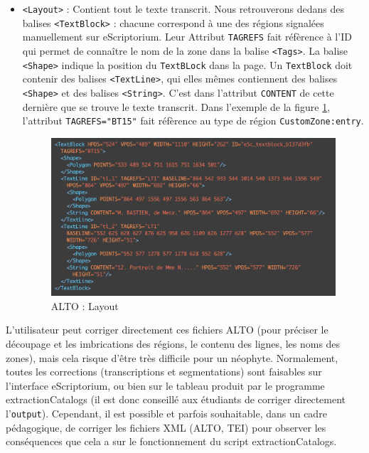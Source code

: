 \documentclass[a4paper,12pt,twoside]{book}
\begin{document}
\begin{itemize}
	\item \texttt{<Layout>} : Contient tout le texte transcrit. Nous retrouverons dedans des balises \texttt{<TextBlock>} : chacune correspond à une des régions signalées manuellement sur eScriptorium. Leur Attribut \texttt{TAGREFS} fait réfèrence à l'ID qui permet de connaître le nom de la zone dans la balise \texttt{<Tags>}. La balise \texttt{<Shape>} indique la position du \texttt{TextBLock} dans la page. Un \texttt{TextBlock} doit contenir des balises \texttt{<TextLine>}, qui elles mêmes contiennent des balises \texttt{<Shape>} et des balises \texttt{<String>}. C'est dans l'attribut \texttt{CONTENT} de cette dernière que se trouve le texte transcrit. Dans l'exemple de la figure \ref{alto4}, l'attribut \texttt{TAGREFS="BT15"} fait réfèrence au type de région \texttt{CustomZone:entry}.
	\begin{figure}[ht]
		\centering
		\includegraphics[scale=0.5]{textblock_alto.png}		
		\caption{ALTO : Layout}
		\label{alto4}
	\end{figure} 	
\end{itemize}

L'utilisateur peut corriger directement ces fichiers ALTO (pour préciser le découpage et les imbrications des régions, le contenu des lignes, les noms des zones), mais cela risque d'être très difficile pour un néophyte. Normalement, toutes les corrections (transcriptions et segmentations) sont faisables sur l'interface eScriptorium, ou bien sur le tableau produit par le programme extractionCatalogs (il est donc conseillé aux étudiants de corriger directement l'\texttt{output}). Cependant, il est possible et parfois souhaitable, dans un cadre pédagogique, de corriger les fichiers XML (ALTO, TEI) pour observer les conséquences que cela a sur le fonctionnement du script extractionCatalogs. 
\end{document}
